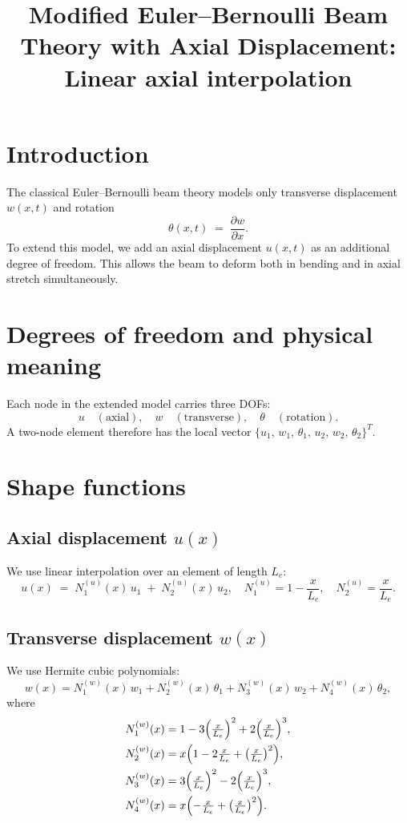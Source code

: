 \documentclass{article}
\title{Modified Euler–Bernoulli Beam Theory with Axial Displacement:\\Linear axial interpolation}
\begin{document}
	\maketitle
	
	\section{Introduction}
	The classical Euler–Bernoulli beam theory models only transverse displacement \(w(x,t)\) and rotation
	\[
	\theta(x,t) \;=\; \frac{\partial w}{\partial x}.
	\]
	To extend this model, we add an axial displacement \(u(x,t)\) as an additional degree of freedom.  This allows the beam to deform both in bending and in axial stretch simultaneously.
	
	\section{Degrees of freedom and physical meaning}
	Each node in the extended model carries three DOFs:
	\[
	u\quad(\text{axial}),\quad
	w\quad(\text{transverse}),\quad
	\theta\quad(\text{rotation}).
	\]
	A two-node element therefore has the local vector
	\(\{u_1,\,w_1,\,\theta_1,\,u_2,\,w_2,\,\theta_2\}^T\).
	
	\section{Shape functions}
	\subsection{Axial displacement \(u(x)\)}
	We use linear interpolation over an element of length \(L_e\):
	\[
	u(x) \;=\; N^{(u)}_1(x)\,u_1 \;+\; N^{(u)}_2(x)\,u_2,
	\quad
	N^{(u)}_1=1-\frac{x}{L_e},\quad
	N^{(u)}_2=\frac{x}{L_e}.
	\]
	
	\subsection{Transverse displacement \(w(x)\)}
	We use Hermite cubic polynomials:
	\[
	w(x)
	= N^{(w)}_1(x)\,w_1
	+ N^{(w)}_2(x)\,\theta_1
	+ N^{(w)}_3(x)\,w_2
	+ N^{(w)}_4(x)\,\theta_2,
	\]
	where
	\begin{align*}
		N^{(w)}_1(x) &= 1-3\Bigl(\tfrac{x}{L_e}\Bigr)^2 + 2\Bigl(\tfrac{x}{L_e}\Bigr)^3,\\
		N^{(w)}_2(x) &= x\Bigl(1-2\tfrac{x}{L_e} + \bigl(\tfrac{x}{L_e}\bigr)^2\Bigr),\\
		N^{(w)}_3(x) &= 3\Bigl(\tfrac{x}{L_e}\Bigr)^2 - 2\Bigl(\tfrac{x}{L_e}\Bigr)^3,\\
		N^{(w)}_4(x) &= x\Bigl(-\tfrac{x}{L_e} + \bigl(\tfrac{x}{L_e}\bigr)^2\Bigr).
	\end{align*}
	
\end{document}
